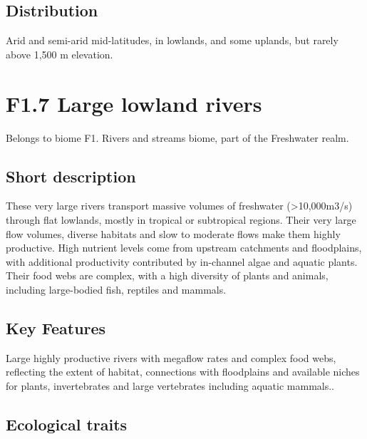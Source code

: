 \documentclass[
  letterpaper,
  DIV=11,
  numbers=noendperiod]{scrartcl}
\begin{document}
\subsection{Distribution}\label{distribution-114}

Arid and semi-arid mid-latitudes, in lowlands, and some uplands, but
rarely above 1,500 m elevation.

\section{F1.7 Large lowland rivers}\label{f1.7-large-lowland-rivers-1}

Belongs to biome F1. Rivers and streams biome, part of the Freshwater
realm.

\subsection{Short description}\label{short-description-115}

These very large rivers transport massive volumes of freshwater
(\textgreater10,000m3/s) through flat lowlands, mostly in tropical or
subtropical regions. Their very large flow volumes, diverse habitats and
slow to moderate flows make them highly productive. High nutrient levels
come from upstream catchments and floodplains, with additional
productivity contributed by in-channel algae and aquatic plants. Their
food webs are complex, with a high diversity of plants and animals,
including large-bodied fish, reptiles and mammals.

\subsection{Key Features}\label{key-features-115}

Large highly productive rivers with megaflow rates and complex food
webs, reflecting the extent of habitat, connections with floodplains and
available niches for plants, invertebrates and large vertebrates
including aquatic mammals..

\subsection{Ecological traits}\label{ecological-traits-115}
\end{document}
